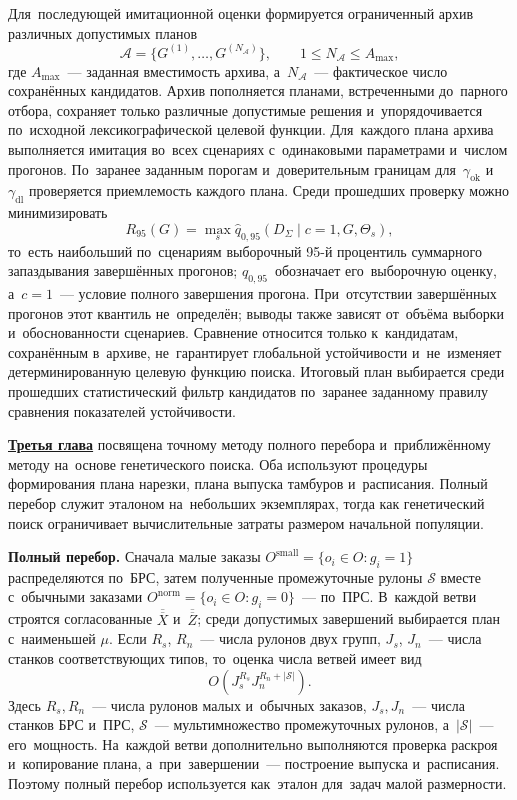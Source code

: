 Для~последующей имитационной оценки формируется ограниченный архив различных допустимых планов
\[
\mathcal A=\{G^{(1)},\ldots,G^{(N_{\mathcal A})}\},
\qquad 1\leq N_{\mathcal A}\leq A_{\max},
\]
где $A_{\max}$~--- заданная вместимость архива, а~$N_{\mathcal A}$~--- фактическое число сохранённых кандидатов. Архив пополняется планами, встреченными до~парного отбора, сохраняет только различные допустимые решения и~упорядочивается по~исходной лексикографической целевой функции. Для~каждого плана архива выполняется имитация во~всех сценариях с~одинаковыми параметрами и~числом прогонов. По~заранее заданным порогам и~доверительным границам для~$\gamma_{\mathrm{ok}}$ и~$\gamma_{\mathrm{dl}}$ проверяется приемлемость каждого плана. Среди прошедших проверку можно минимизировать
\[
R_{95}(G)=\max_s\widehat q_{0{,}95}(D_{\Sigma}\mid c=1,G,\Theta_s),
\]
то~есть наибольший по~сценариям выборочный 95-й процентиль суммарного запаздывания завершённых прогонов; $\widehat q_{0{,}95}$~обозначает его~выборочную оценку, а~$c=1$~--- условие полного завершения прогона. При~отсутствии завершённых прогонов этот квантиль не~определён; выводы также зависят от~объёма выборки и~обоснованности сценариев. Сравнение относится только к~кандидатам, сохранённым в~архиве, не~гарантирует глобальной устойчивости и~не~изменяет детерминированную целевую функцию поиска. Итоговый план выбирается среди прошедших статистический фильтр кандидатов по~заранее заданному правилу сравнения показателей устойчивости.

\underline{\textbf{Третья глава}} посвящена точному методу полного перебора и~приближённому методу на~основе генетического поиска. Оба используют процедуры формирования плана нарезки, плана выпуска тамбуров и~расписания. Полный перебор служит эталоном на~небольших экземплярах, тогда как генетический поиск ограничивает вычислительные затраты размером начальной популяции.

\textbf{Полный перебор.} Сначала малые заказы $O^{\mathrm{small}}=\{o_i\in O:g_i=1\}$ распределяются по~БРС, затем полученные промежуточные рулоны $\mathcal S$ вместе с~обычными заказами $O^{\mathrm{norm}}=\{o_i\in O:g_i=0\}$~--- по~ПРС. В~каждой ветви строятся согласованные $\overline{\overline X}$ и~$\overline{\overline Z}$; среди допустимых завершений выбирается план с~наименьшей $\mu$. Если $R_s$, $R_n$~--- числа рулонов двух групп, $J_s$, $J_n$~--- числа станков соответствующих типов, то~оценка числа ветвей имеет вид
\[
O\!\left(J_s^{R_s}J_n^{R_n+|\mathcal S|}\right).
\]
Здесь $R_s,R_n$~--- числа рулонов малых и~обычных заказов, $J_s,J_n$~--- числа станков БРС и~ПРС, $\mathcal S$~--- мультимножество промежуточных рулонов, а~$|\mathcal S|$~--- его~мощность. На~каждой ветви дополнительно выполняются проверка раскроя и~копирование плана, а~при~завершении~--- построение выпуска и~расписания. Поэтому полный перебор используется как~эталон для~задач малой размерности.

